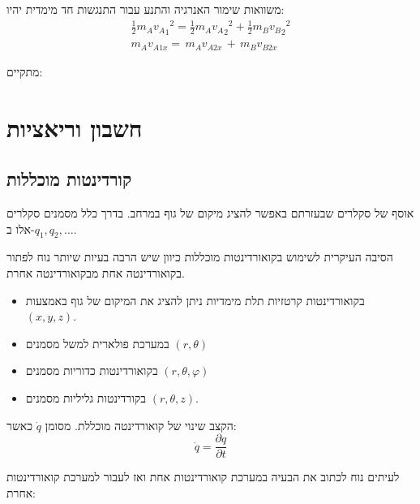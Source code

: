 \documentclass{tstextbook}
\begin{document}
\begin{proposition}
משוואות שימור האנרגיה והתנע עבור התנגשות חד מימדית יהיו:
\begin{gather*}{\frac{1}{2}}m_{A}{v_{A}}_{1}{}^{2}={\frac{1}{2}}m_{A}{v_{A}}_{2}{}^{2}+{\frac{1}{2}}m_{B}{v_{B}}_{2}{}^{2} \\m_{A}v_{A1x}=\,m_{A}v_{A2x}\,+\,m_{B}v_{B2x}
\end{gather*}

\end{proposition}
\begin{corollary}
מתקיים:

\end{corollary}
\chapter{חשבון וריאציות}

\section{קורדינטות מוכללות}

\begin{definition}
אוסף של סקלרים שבעזרתם באפשר להציג מיקום של גוף במרחב.
בדרך כלל מסמנים סקלרים אלו ב-\(q_{1},q_{2},\dots\).

\end{definition}
\begin{remark}
הסיבה העיקרית לשימוש בקואורדינטות מוכללות כיוון שיש הרבה בעיות שיותר נוח לפתור בקואורדינטה אחת מבקואורדינטה אחרת.

\end{remark}
\begin{example}
  \begin{itemize}
    \item בקואורדינטות קרטזיות תלת מימדיות ניתן להציג את המיקום של גוף באמצעות \((x,y,z)\).
    \item במערכת פולארית למשל מסמנים \(\left( r,\theta \right)\)
    \item בקואורדינטות כדוריות מסמנים \(\left( r,\theta,\varphi \right)\)
    \item בקורדינטות גליליות מסמנים \(\left( r,\theta,z \right)\).
  \end{itemize}
\end{example}
\begin{definition}
הקצב שינוי של קואורדינטה מוכללת. מסומן \(\dot{q}\) כאשר:
$$\dot{q}=\frac{\partial q}{\partial t}$$

\end{definition}
לעיתים נוח לכתוב את הבעיה במערכת קואורדינטות אחת ואז לעבור למערכת קואורדינטות אחרת:
\end{document}
